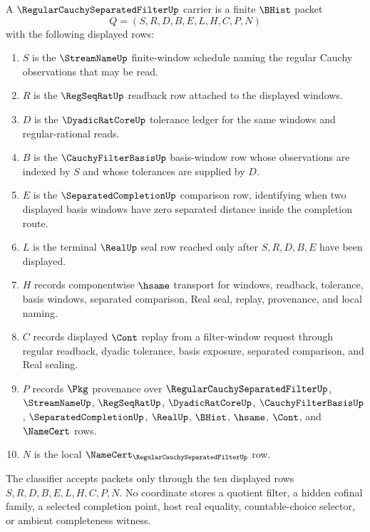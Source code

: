 \begin{definition}
\label{def:regular-cauchy-separated-filter-carrier}
A $\RegularCauchySeparatedFilterUp$ carrier is a finite $\BHist$ packet
$$
Q=(S,R,D,B,E,L,H,C,P,N)
$$
with the following displayed rows:
\begin{enumerate}
\item $S$ is the $\StreamNameUp$ finite-window schedule naming the regular Cauchy observations that may be read.
\item $R$ is the $\RegSeqRatUp$ readback row attached to the displayed windows.
\item $D$ is the $\DyadicRatCoreUp$ tolerance ledger for the same windows and regular-rational reads.
\item $B$ is the $\CauchyFilterBasisUp$ basis-window row whose observations are indexed by $S$ and whose tolerances are supplied by $D$.
\item $E$ is the $\SeparatedCompletionUp$ comparison row, identifying when two displayed basis windows have zero separated distance inside the completion route.
\item $L$ is the terminal $\RealUp$ seal row reached only after $S,R,D,B,E$ have been displayed.
\item $H$ records componentwise $\hsame$ transport for windows, readback, tolerance, basis windows, separated comparison, Real seal, replay, provenance, and local naming.
\item $C$ records displayed $\Cont$ replay from a filter-window request through regular readback, dyadic tolerance, basis exposure, separated comparison, and Real sealing.
\item $P$ records $\Pkg$ provenance over $\RegularCauchySeparatedFilterUp$, $\StreamNameUp$, $\RegSeqRatUp$, $\DyadicRatCoreUp$, $\CauchyFilterBasisUp$, $\SeparatedCompletionUp$, $\RealUp$, $\BHist$, $\hsame$, $\Cont$, and $\NameCert$ rows.
\item $N$ is the local $\NameCert_{\RegularCauchySeparatedFilterUp}$ row.
\end{enumerate}
The classifier accepts packets only through the ten displayed rows $S,R,D,B,E,L,H,C,P,N$. No coordinate stores a quotient filter, a hidden cofinal family, a selected completion point, host real equality, countable-choice selector, or ambient completeness witness.
\end{definition}

